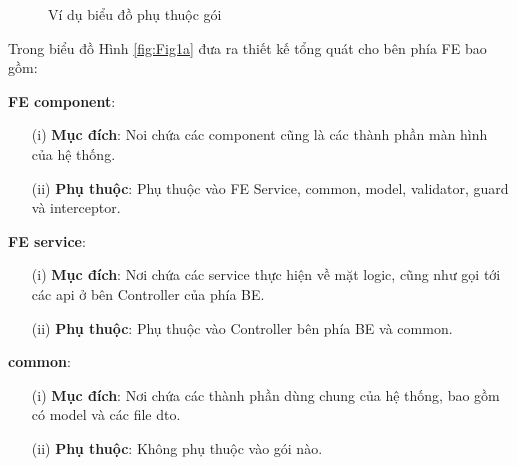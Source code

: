 \documentclass[../DoAn.tex]{subfiles}
\begin{document}
\begin{figure}[H]
    \centering
    \caption{Ví dụ biểu đồ phụ thuộc gói}
    \label{fig:Fig1}
\end{figure}

Trong biểu đồ Hình \ref{fig:Fig1a}  đưa ra thiết kế tổng quát cho bên phía FE bao gồm:

\textbf{FE component}:
\begin{enumerate}
    \item[(i)] \textbf{Mục đích}: Noi chứa các component cũng là các thành phần màn hình của hệ thống.
    \item[(ii)] \textbf{Phụ thuộc}: Phụ thuộc vào FE Service, common, model, validator, guard và interceptor. 
\end{enumerate}

\textbf{FE service}:
\begin{enumerate}
    \item[(i)] \textbf{Mục đích}: Nơi chứa các service thực hiện về mặt logic, cũng như gọi tới các api ở bên Controller của phía BE.
    \item[(ii)] \textbf{Phụ thuộc}: Phụ thuộc vào Controller bên phía BE và common.
\end{enumerate}

\textbf{common}:
\begin{enumerate}
    \item[(i)] \textbf{Mục đích}: Nơi chứa các thành phần dùng chung của hệ thống, bao gồm có model và các file dto.
    \item[(ii)] \textbf{Phụ thuộc}: Không phụ thuộc vào gói nào.
\end{enumerate}
\end{document}
